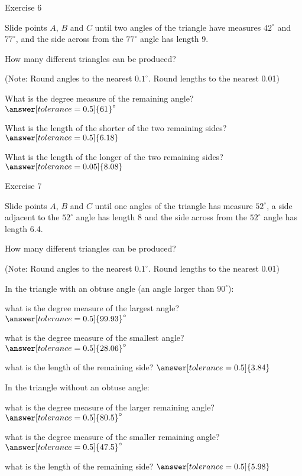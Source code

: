 \documentclass{ximera}
\begin{document}
Exercise 6

Slide points $A$, $B$ and $C$ until two angles of the triangle have measures $42^\circ$ and $77^\circ$, and the side across from the $77^\circ$ angle has length 9.

\begin{question}
How many different triangles can be produced?
\begin{multipleChoice}
\end{multipleChoice}
\begin{question}
(Note: Round angles to the nearest $0.1^\circ$. Round lengths to the nearest 0.01)

What is the degree measure of the remaining angle? $\answer[tolerance=0.5]{61}^\circ$

What is the length of the shorter of the two remaining sides? $\answer[tolerance=0.5]{6.18}$

What is the length of the longer of the two remaining sides? $\answer[tolerance=0.05]{8.08}$
\end{question}
\end{question}

Exercise 7

Slide points $A$, $B$ and $C$ until one angles of the triangle has measure $52^\circ$, a side adjacent to the $52^\circ$ angle has length 8 and the side across from the $52^\circ$ angle has length 6.4.

\begin{question}
How many different triangles can be produced?
\begin{multipleChoice}
\end{multipleChoice}
\begin{question}
(Note: Round angles to the nearest $0.1^\circ$. Round lengths to the nearest 0.01)

In the triangle with an obtuse angle (an angle larger than $90^\circ$): 

what is the degree measure of the largest angle? $\answer[tolerance=0.5]{99.93}^\circ$

what is the degree measure of the smallest angle? $\answer[tolerance=0.5]{28.06}^\circ$

what is the length of the remaining side? $\answer[tolerance=0.5]{3.84}$

In the triangle without an obtuse angle:

what is the degree measure of the larger remaining angle? $\answer[tolerance=0.5]{80.5}^\circ$

what is the degree measure of the smaller remaining angle? $\answer[tolerance=0.5]{47.5}^\circ$

what is the length of the remaining side? $\answer[tolerance=0.5]{5.98}$

\end{question}
\end{question}
\end{document}
